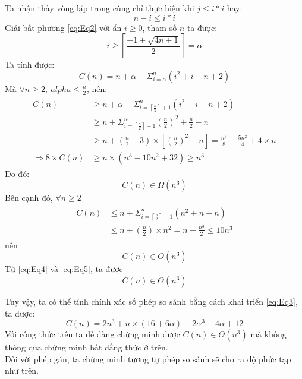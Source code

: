 \documentclass{article}
\begin{document}
	\begin{flushleft}
		Ta nhận thấy vòng lặp trong cùng chỉ thực hiện khi $j \leq i*i$ hay:
		\begin{equation}\label{eq:Eq1} 
			n - i \leq i*i
		\end{equation}
		Giải bất phương \ref{eq:Eq2} với ẩn $i \geq 0$, tham số $n$ ta được:
		\begin{equation}\label{eq:Eq2}
			i \geq  \left\lceil\frac{-1 +\sqrt{4n + 1}}{2}\right\rceil = \alpha
		\end{equation}
		Ta tính được:
		\begin{equation}\label{eq:Eq3}
			C(n) = n + \alpha + \Sigma_{i = \alpha}^{n}\left(i^2+i-n+2\right)
		\end{equation}
		Mà $\forall n \geq 2,~alpha \leq \frac{n}{2}$, nên:\\
		\begin{gather}
			\begin{align*}
			C(n) & \geq n + \alpha + \Sigma_{i = \left\lceil \frac{n}{2} \right\rceil + 1}^{n}\left(i^2+i-n+2\right)\\
			& \geq n + \Sigma_{i = \left\lceil \frac{n}{2} \right\rceil + 1}^{n}\left( \frac{n}{2} \right)^2 + \frac{n}{2} - n \\
			& \geq n + \left( \frac{n}{2} - 3 \right) \times \left[ \left( \frac{n}{2} \right)^2  - n \right] = \frac{n^3}{8} - \frac{5n^2}{4} + 4\times n\\
			\Rightarrow 8 \times C(n) &\geq n\times \left(  n^3 - 10n^2 + 32 \right) \geq n^3 
			\end{align*}
		\end{gather}
		Do đó: 
		\begin{equation}\label{eq:Eq4}
			C(n) \in \Omega(n^3)
		\end{equation}
		Bên cạnh đó, $\forall n \geq 2$
		\begin{gather}
			\begin{align*}
				C(n) &\leq n + \Sigma_{i = \left\lceil \frac{n}{2} \right\rceil + 1}^{n}\left(n^2 + n - n\right) \\
				&\leq n + \left(\frac{n}{2}\right) \times n^2 = n + \frac{n^3}{2} \leq 10n^3
			\end{align*}
		\end{gather}	
		nên 
		\begin{equation}\label{eq:Eq5}
			C(n) \in O(n^3)
		\end{equation}
		Từ \ref{eq:Eq4} và \ref{eq:Eq5}, ta được\\
		\begin{equation}\label{eq:Eq6}
			C(n) \in \Theta(n^3)
		\end{equation}
		
		Tuy vậy, ta có thể tính chính xác số phép so sánh bằng cách khai triển \ref{eq:Eq3}, ta được:
		\begin{equation}
			C(n) = 2n^3 + n\times(16+6\alpha) - 2\alpha^3 -4\alpha + 12
		\end{equation}
		Với công thức trên ta dễ dàng chứng minh được $C(n) \in \Theta(n^3)$ mà không thông qua chứng minh bất đẳng thức ở trên.\\
		Đối với phép gán, ta chứng minh tương tự phép so sánh sẽ cho ra độ phức tạp như trên.
	\end{flushleft}
\end{document}
